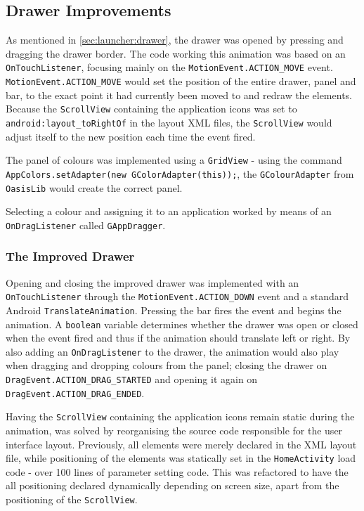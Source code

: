 \subsection{Drawer Improvements}\label{sec:developments:drawerimprovements}
As mentioned in \cref{sec:launcher:drawer}, the drawer was opened by pressing and dragging the drawer border.
The code working this animation was based on an \lstinline{OnTouchListener}, focusing mainly on the \lstinline{MotionEvent.ACTION_MOVE} event.
\lstinline{MotionEvent.ACTION_MOVE} would set the position of the entire drawer, panel and bar, to the exact point it had currently been moved to and redraw the elements.
Because the \lstinline{ScrollView} containing the application icons was set to \lstinline{android:layout_toRightOf} in the layout XML files, the \lstinline{ScrollView} would adjust itself to the new position each time the event fired.

The panel of colours was implemented using a \lstinline{GridView} - using the command \lstinline{AppColors.setAdapter(new GColorAdapter(this));}, the \lstinline{GColourAdapter} from \lstinline{OasisLib} would create the correct panel.

Selecting a colour and assigning it to an application worked by means of an \lstinline{OnDragListener} called \lstinline{GAppDragger}.

\subsubsection*{The Improved Drawer}

Opening and closing the improved drawer was implemented with an \lstinline{OnTouchListener} through the \lstinline{MotionEvent.ACTION_DOWN} event and a standard Android \lstinline{TranslateAnimation}.
Pressing the bar fires the event and begins the animation.
A \lstinline{boolean} variable determines whether the drawer was open or closed when the event fired and thus if the animation should translate left or right.
By also adding an \lstinline{OnDragListener} to the drawer, the animation would also play when dragging and dropping colours from the panel; closing the drawer on \lstinline{DragEvent.ACTION_DRAG_STARTED} and opening it again on \lstinline{DragEvent.ACTION_DRAG_ENDED}.

Having the \lstinline{ScrollView} containing the application icons remain static during the animation, was solved by reorganising the source code responsible for the user interface layout. 
Previously, all elements were merely declared in the XML layout file, while positioning of the elements was statically set in the \lstinline{HomeActivity} load code - over 100 lines of parameter setting code.
This was refactored to have the all positioning declared dynamically depending on screen size, apart from the positioning of the \lstinline{ScrollView}.

